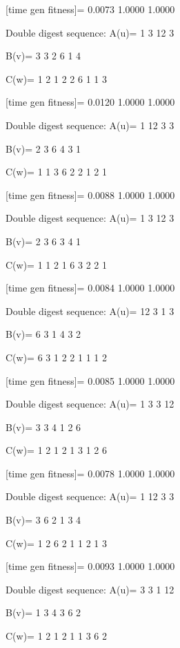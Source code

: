 [time gen fitness]=
    0.0073    1.0000    1.0000

Double digest sequence:
A(u)=
     1     3    12     3

B(v)=
     3     3     2     6     1     4

C(w)=
     1     2     1     2     2     6     1     1     3

[time gen fitness]=
    0.0120    1.0000    1.0000

Double digest sequence:
A(u)=
     1    12     3     3

B(v)=
     2     3     6     4     3     1

C(w)=
     1     1     3     6     2     2     1     2     1

[time gen fitness]=
    0.0088    1.0000    1.0000

Double digest sequence:
A(u)=
     1     3    12     3

B(v)=
     2     3     6     3     4     1

C(w)=
     1     1     2     1     6     3     2     2     1

[time gen fitness]=
    0.0084    1.0000    1.0000

Double digest sequence:
A(u)=
    12     3     1     3

B(v)=
     6     3     1     4     3     2

C(w)=
     6     3     1     2     2     1     1     1     2

[time gen fitness]=
    0.0085    1.0000    1.0000

Double digest sequence:
A(u)=
     1     3     3    12

B(v)=
     3     3     4     1     2     6

C(w)=
     1     2     1     2     1     3     1     2     6

[time gen fitness]=
    0.0078    1.0000    1.0000

Double digest sequence:
A(u)=
     1    12     3     3

B(v)=
     3     6     2     1     3     4

C(w)=
     1     2     6     2     1     1     2     1     3

[time gen fitness]=
    0.0093    1.0000    1.0000

Double digest sequence:
A(u)=
     3     3     1    12

B(v)=
     1     3     4     3     6     2

C(w)=
     1     2     1     2     1     1     3     6     2

